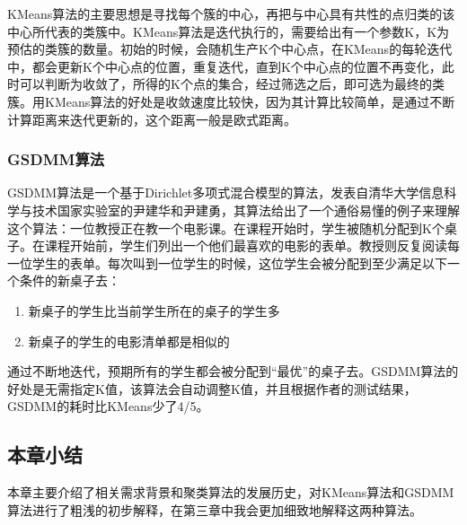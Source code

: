 KMeans算法的主要思想是寻找每个簇的中心，再把与中心具有共性的点归类的该中心所代表的类簇中。KMeans算法是迭代执行的，需要给出有一个参数K，K为预估的类簇的数量。初始的时候，会随机生产K个中心点，在KMeans的每轮迭代中，都会更新K个中心点的位置，重复迭代，直到K个中心点的位置不再变化，此时可以判断为收敛了，所得的K个点的集合，经过筛选之后，即可选为最终的类簇。用KMeans算法的好处是收敛速度比较快，因为其计算比较简单，是通过不断计算距离来迭代更新的，这个距离一般是欧式距离。

\subsubsection{GSDMM算法}
GSDMM算法是一个基于Dirichlet多项式混合模型的算法，发表自清华大学信息科学与技术国家实验室的尹建华和尹建勇\cite{Yin:2014:DMM:2623330.2623715}，其算法给出了一个通俗易懂的例子来理解这个算法：一位教授正在教一个电影课。在课程开始时，学生被随机分配到K个桌子。在课程开始前，学生们列出一个他们最喜欢的电影的表单。教授则反复阅读每一位学生的表单。每次叫到一位学生的时候，这位学生会被分配到至少满足以下一个条件的新桌子去：
\begin{enumerate}
	\item 新桌子的学生比当前学生所在的桌子的学生多
	\item 新桌子的学生的电影清单都是相似的
\end{enumerate}
通过不断地迭代，预期所有的学生都会被分配到“最优”的桌子去。GSDMM算法的好处是无需指定K值，该算法会自动调整K值，并且根据作者的测试结果，GSDMM的耗时比KMeans少了4/5。

\subsection{本章小结}

本章主要介绍了相关需求背景和聚类算法的发展历史，对KMeans算法和GSDMM算法进行了粗浅的初步解释，在第三章中我会更加细致地解释这两种算法。
